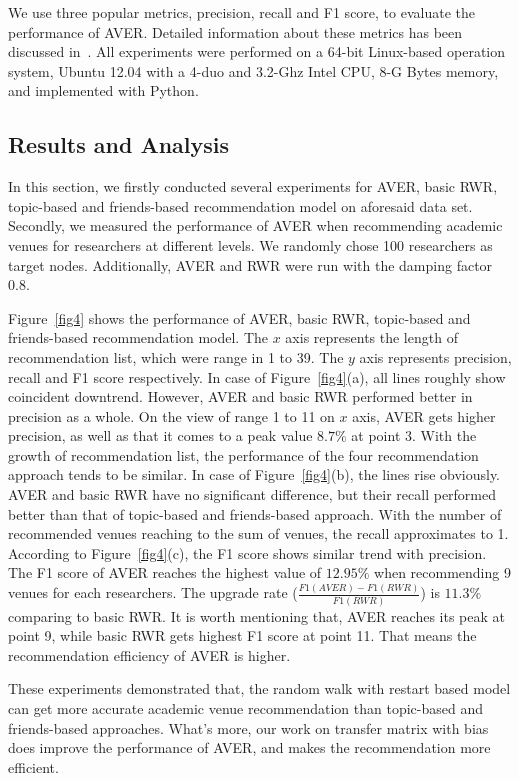 \documentclass[9pt]{acm_proc_article-sp}
\begin{document}
We use three popular metrics, precision, recall and F1 score, to evaluate the performance of AVER. Detailed information about these metrics has been discussed in~\cite{xia2014mvcwalker}. All experiments were performed on a 64-bit Linux-based operation system, Ubuntu 12.04 with a 4-duo and 3.2-Ghz Intel CPU, 8-G Bytes memory, and implemented with Python.

\subsection{Results and Analysis}
In this section, we firstly conducted several experiments for AVER, basic RWR, topic-based and friends-based recommendation model on aforesaid data set. Secondly, we measured the performance of AVER when recommending academic venues for researchers at different levels. We randomly chose 100 researchers as target nodes. Additionally, AVER and RWR were run with the damping factor 0.8.

Figure~\ref{fig4} shows the performance of AVER, basic RWR, topic-based and friends-based recommendation model. The $x$ axis represents the length of recommendation list, which were range in 1 to 39. The $y$ axis represents precision, recall and F1 score respectively. In case of Figure~\ref{fig4}(a), all lines roughly show coincident downtrend. However, AVER and basic RWR performed better in precision as a whole. On the view of range 1 to 11 on $x$ axis, AVER gets higher precision, as well as that it comes to a peak value $8.7\%$ at point 3. With the growth of recommendation list, the performance of the four recommendation approach tends to be similar. In case of Figure~\ref{fig4}(b), the lines rise obviously. AVER and basic RWR have no significant difference, but their recall performed better than that of topic-based and friends-based approach. With the number of recommended venues reaching to the sum of venues, the recall approximates to 1. According to Figure~\ref{fig4}(c), the F1 score shows similar trend with precision. The F1 score of AVER reaches the highest value of $12.95\%$ when recommending 9 venues for each researchers. The upgrade rate ($\frac{F1(AVER)-F1(RWR)}{F1(RWR)}$) is $11.3\%$ comparing to basic RWR. It is worth mentioning that, AVER reaches its peak at point 9, while basic RWR gets highest F1 score at point 11. That means the recommendation efficiency of AVER is higher.

These experiments demonstrated that, the random walk with restart based model can get more accurate academic venue recommendation than topic-based and friends-based approaches. What's more, our work on transfer matrix with bias does improve the performance of AVER, and makes the recommendation more efficient.
\end{document}
